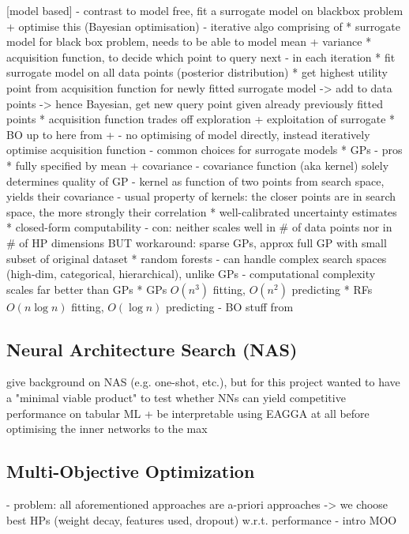 \documentclass[twoside,11pt]{article}
\begin{document}
[model based]
- contrast to model free, fit a surrogate model on blackbox problem + optimise this
(Bayesian optimisation)
- iterative algo comprising of
  * surrogate model for black box problem, needs to be able to model mean + variance
  * acquisition function, to decide which point to query next
- in each iteration
  * fit surrogate model on all data points (posterior distribution)
  * get highest utility point from acquisition function for newly fitted surrogate model -> add to data points
  -> hence Bayesian, get new query point given already previously fitted points
  * acquisition function trades off exploration + exploitation of surrogate
  * BO up to here from \citep[chap. 1.3.2]{feurer_hyperparameter_2019} + \citep[pp. 2-3]{frazier2018tutorialbayesianoptimization}
- no optimising of model directly, instead iteratively optimise acquisition function
- common choices for surrogate models
  * GPs
    - pros
      * fully specified by mean + covariance
        - covariance function (aka kernel) solely determines quality of GP
        - kernel as function of two points from search space, yields their covariance
        - usual property of kernels: the closer points are in search space, the more strongly their correlation \citep[p. 5]{frazier2018tutorialbayesianoptimization}
      * well-calibrated uncertainty estimates
      * closed-form computability
    - con: neither scales well in \# of data points nor in \# of HP dimensions BUT workaround: sparse GPs, approx full GP with small subset of original dataset
  * random forests
    - can handle complex search spaces (high-dim, categorical, hierarchical), unlike GPs
    - computational complexity scales far better than GPs
      * GPs $O(n^3)$ fitting, $O(n^2)$ predicting
      * RFs $O(n \log n)$ fitting, $O(\log n)$ predicting
- BO stuff from \citep[chap. 1.3.2]{feurer_hyperparameter_2019}

  
\subsection{Neural Architecture Search (NAS)}
give background on NAS (e.g. one-shot, etc.), but for this project wanted to have a "minimal viable product" to test whether NNs can yield competitive performance
on tabular ML + be interpretable using EAGGA at all before optimising the inner networks to the max

\subsection{Multi-Objective Optimization}
- problem: all aforementioned approaches are a-priori approaches -> we choose best HPs (weight decay, features used, dropout) w.r.t. performance
- intro MOO
\end{document}
